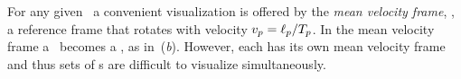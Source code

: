 For any given \rpo\ a convenient visualization is
offered by the {\em mean velocity frame}, {\ie},
a reference frame that rotates with velocity
$v_p=\ell_p/{T_{p}}$.
In the mean velocity frame a \rpo\ becomes
a \po, as in \,(\textit{b}).
However, each {\rpo} has its own mean velocity frame and thus
sets of \rpo s are difficult to visualize simultaneously.
